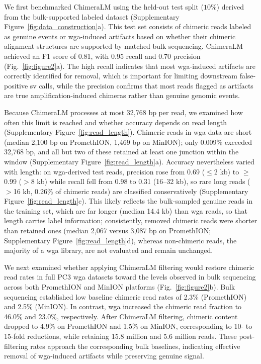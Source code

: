 \documentclass[pdflatex,lineno]{sn-jnl}%
\newif\ifrevisedtext
\newcommand{\chg}[1]{\ifrevisedtext\textcolor{revcolor}{#1}\else#1\fi}
\begin{document}
We first benchmarked ChimeraLM using the held-out test split ($10\%$) derived from the bulk-supported labeled dataset (Supplementary Figure~\ref{fig:data_construction}a).
This test set consists of chimeric reads labeled as genuine events or \gls{wga}-induced artifacts based on whether their chimeric alignment structures are supported by matched bulk sequencing.
ChimeraLM achieved an F1 score of 0.81, with 0.95 recall and 0.70 precision (Fig.~\ref{fig:figure2}a).
The high recall indicates that most \gls{wga}-induced artifacts are correctly identified for removal, which is important for limiting downstream false-positive \gls{sv} calls, while the precision confirms that most reads flagged as artifacts are true amplification-induced chimeras rather than genuine genomic events.

\chg{Because ChimeraLM processes at most 32,768 bp per read, we examined how often this limit is reached and whether accuracy depends on read length (Supplementary Figure~\ref{fig:read_length}).
	Chimeric reads in \gls{wga} data are short (median 2,100 bp on PromethION, 1,469 bp on MinION); only 0.009\% exceeded 32,768 bp, and all but two of these retained at least one junction within the window (Supplementary Figure~\ref{fig:read_length}a).
	Accuracy nevertheless varied with length: on \gls{wga}-derived test reads, precision rose from 0.69 ($\leq$2 kb) to $\geq$0.99 ($>$8 kb) while recall fell from 0.98 to 0.31 (16--32 kb), so rare long reads ($>$16 kb, 0.26\% of chimeric reads) are classified conservatively (Supplementary Figure~\ref{fig:read_length}c).
	This likely reflects the bulk-sampled genuine reads in the training set, which are far longer (median 14.4 kb) than \gls{wga} reads, so that length carries label information; consistently, removed chimeric reads were shorter than retained ones (median 2,067 versus 3,087 bp on PromethION; Supplementary Figure~\ref{fig:read_length}d), whereas non-chimeric reads, the majority of a \gls{wga} library, are not evaluated and remain unchanged.}

We next examined whether applying ChimeraLM filtering would restore chimeric read rates in full PC3 \gls{wga} datasets toward the levels observed in bulk sequencing across both PromethION and MinION platforms (Fig.~\ref{fig:figure2}b).
Bulk sequencing established low baseline chimeric read rates of 2.3\% (PromethION) and 2.5\% (MinION).
In contrast, \gls{wga} increased the chimeric read fraction to 46.0\% and 23.0\%, respectively.
After ChimeraLM filtering, chimeric content dropped to 4.9\% on PromethION and 1.5\% on MinION, corresponding to 10- to 15-fold reductions, while retaining 15.8 million and 5.6 million reads.
These post-filtering rates approach the corresponding bulk baselines, indicating effective removal of \gls{wga}-induced artifacts while preserving genuine signal.
\end{document}
